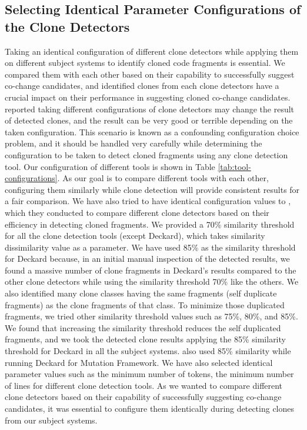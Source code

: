 \documentclass[review]{elsarticle}
\begin{document}
\subsection{Selecting Identical Parameter Configurations of the Clone Detectors} 
Taking an identical configuration of different clone detectors while applying them on different subject systems to identify cloned code fragments is essential. We compared them with each other based on their capability to successfully suggest co-change candidates, and identified clones from each clone detectors have a crucial impact on their performance in suggesting cloned co-change candidates. \citet{Wang-2013-SBC-2491411-2491420} reported taking different configurations of clone detectors may change the result of detected clones, and the result can be very good or terrible depending on the taken configuration. This scenario is known as a confounding configuration choice problem, and it should be handled very carefully while determining the configuration to be taken to detect cloned fragments using any clone detection tool. 
Our configuration of different tools is shown in Table \ref{tab:tool-configurations}. As our goal is to compare different tools with each other, configuring them similarly while clone detection will provide consistent results for a fair comparison. We have also tried to have identical configuration values to \citet{jeff-evaluating}, which they conducted to compare different clone detectors based on their efficiency in detecting cloned fragments. We provided a 70\% similarity threshold for all the clone detection tools (except Deckard), which takes similarity dissimilarity value as a parameter. We have used 85\% as the similarity threshold for Deckard because, in an initial manual inspection of the detected results, we found a massive number of clone fragments in Deckard's results compared to the other clone detectors while using the similarity threshold 70\% like the others. We also identified many clone classes having the same fragments (self duplicate fragments) as the clone fragments of that class. To minimize those duplicated fragments, we tried other similarity threshold values such as 75\%, 80\%, and  85\%. We found that increasing the similarity threshold reduces the self duplicated fragments, and we took the detected clone results applying the 85\% similarity threshold for Deckard in all the subject systems. \citet{jeff-evaluating} also used 85\% similarity while running Deckard for Mutation Framework. We have also selected identical parameter values such as the minimum number of tokens, the minimum number of lines for different clone detection tools. As we wanted to compare different clone detectors based on their capability of successfully suggesting co-change candidates, it was essential to configure them identically during detecting clones from our subject systems.
\end{document}
